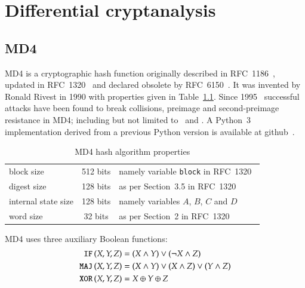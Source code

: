 \renewcommand*\chappic{img/diff-crypt.pdf}
\renewcommand*\chapquote{Just because it's automatic doesn't mean it works.}
\renewcommand*\chapquotesrc{Daniel J. Bernstein}
\chapter{Differential cryptanalysis}
\label{ch:dc}
%
\section{MD4}
\label{sec:dc-md4}
%
MD4 is a cryptographic hash function originally described in RFC~1186~\cite{rfc1186},
updated in RFC~1320~\cite{rfc1320} and declared obsolete by RFC~6150~\cite{rfc6150}. It was
invented by Ronald Rivest in 1990 with properties given in Table~\ref{tab:md4}.
Since 1995~\cite{Dobbertin1998} successful attacks have been found to break collisions,
preimage and second-preimage resistance in MD4; including but not limited to~\cite{md4-2007} and
\cite{cryptoeprint:2005:151}. A Python~3 implementation derived from a previous Python version
is available at github~\cite{md4-py3k}.

\begin{table}[h]
  \begin{center}
    \begin{tabular}{lcl}
      block size           & 512 bits       & namely variable \texttt{block} in RFC~1320~\cite{rfc1320} \\
      digest size          & 128 bits       & as per Section~3.5 in RFC~1320~\cite{rfc1320} \\
      internal state size  & 128 bits       & namely variables $A$, $B$, $C$ and $D$ \\
      word size            & 32 bits        & as per Section~2 in RFC~1320~\cite{rfc1320} \\
    \end{tabular}
    \caption{MD4 hash algorithm properties}
    \label{tab:md4}
  \end{center}
\end{table}

MD4 uses three auxiliary Boolean functions:
\begin{align}
  \operatorname{\texttt{IF\,}}(X,Y,Z) &= (X \land Y) \lor (\neg X \land Z) \\
  \operatorname{\texttt{MAJ\,}}(X,Y,Z) &= (X \land Y) \lor (X \land Z) \lor (Y \land Z) \\
  \operatorname{\texttt{XOR\,}}(X,Y,Z) &= X \oplus Y \oplus Z
\end{align}

